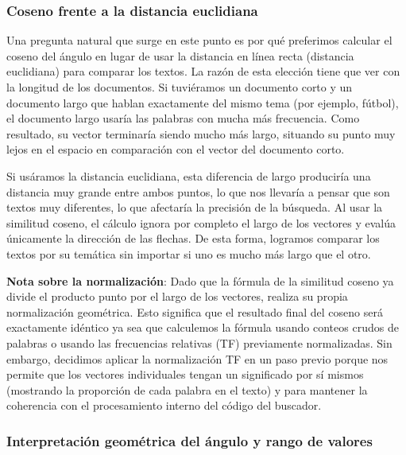 \documentclass[12pt,a4paper]{article}
\begin{document}
\subsubsection{Coseno frente a la distancia euclidiana}

Una pregunta natural que surge en este punto es por qué preferimos calcular el coseno del ángulo en lugar de usar la distancia en línea recta (distancia euclidiana) para comparar los textos. La razón de esta elección tiene que ver con la longitud de los documentos. Si tuviéramos un documento corto y un documento largo que hablan exactamente del mismo tema (por ejemplo, fútbol), el documento largo usaría las palabras con mucha más frecuencia. Como resultado, su vector terminaría siendo mucho más largo, situando su punto muy lejos en el espacio en comparación con el vector del documento corto. 

Si usáramos la distancia euclidiana, esta diferencia de largo produciría una distancia muy grande entre ambos puntos, lo que nos llevaría a pensar que son textos muy diferentes, lo que afectaría la precisión de la búsqueda. Al usar la similitud coseno, el cálculo ignora por completo el largo de los vectores y evalúa únicamente la dirección de las flechas. De esta forma, logramos comparar los textos por su temática sin importar si uno es mucho más largo que el otro.

\textbf{Nota sobre la normalización}: Dado que la fórmula de la similitud coseno ya divide el producto punto por el largo de los vectores, realiza su propia normalización geométrica. Esto significa que el resultado final del coseno será exactamente idéntico ya sea que calculemos la fórmula usando conteos crudos de palabras o usando las frecuencias relativas (TF) previamente normalizadas. Sin embargo, decidimos aplicar la normalización TF en un paso previo porque nos permite que los vectores individuales tengan un significado por sí mismos (mostrando la proporción de cada palabra en el texto) y para mantener la coherencia con el procesamiento interno del código del buscador.

\subsubsection{Interpretación geométrica del ángulo y rango de valores}
\end{document}
